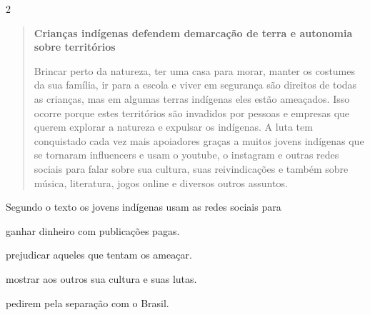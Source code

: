 
\num{2}

\begin{quote}
\textbf{Crianças indígenas defendem demarcação de terra e autonomia
sobre territórios}

Brincar perto da natureza, ter uma casa para morar, manter os costumes
da sua família, ir para a escola e viver em segurança são direitos de
todas as crianças, mas em algumas terras indígenas eles estão ameaçados.
Isso ocorre porque estes territórios são invadidos por pessoas e
empresas que querem explorar a natureza e expulsar os indígenas. A luta
tem conquistado cada vez mais apoiadores graças a muitos jovens
indígenas que se tornaram influencers e usam o youtube, o instagram e
outras redes sociais para falar sobre sua cultura, suas reivindicações e
também sobre música, literatura, jogos online e diversos outros
assuntos.

\end{quote}

Segundo o texto os jovens indígenas usam as redes sociais para

\begin{escolha}
\item ganhar dinheiro com publicações pagas.

\item prejudicar aqueles que tentam os ameaçar.

\item mostrar aos outros sua cultura e suas lutas.

\item pedirem pela separação com o Brasil.
\end{escolha}

